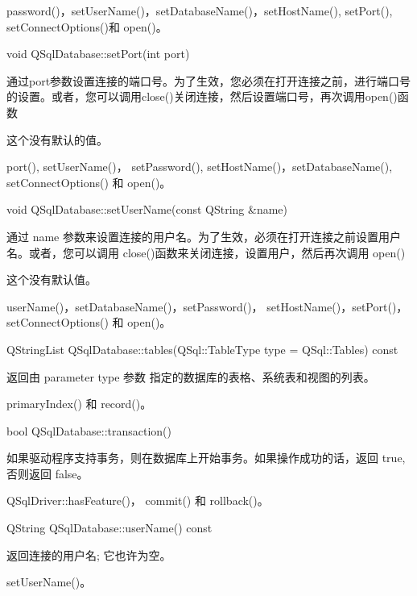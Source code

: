 \begin{seeAlso}
password()，setUserName()，setDatabaseName()，setHostName(),
setPort(), setConnectOptions()和 open()。
\end{seeAlso}

void QSqlDatabase::setPort(int port)

通过port参数设置连接的端口号。为了生效，您必须在打开连接之前，进行端口号的设置。或者，您可以调用close()关闭连接，然后设置端口号，再次调用open()函数

这个没有默认的值。

\begin{seeAlso}
port(), setUserName()， setPassword(),
setHostName()，setDatabaseName(), setConnectOptions() 和 open()。
\end{seeAlso}


void QSqlDatabase::setUserName(const QString \&name)

通过 name 参数来设置连接的用户名。为了生效，必须在打开连接之前设置用户名。或者，您可以调用 close()函数来关闭连接，设置用户，然后再次调用 open()

这个没有默认值。

\begin{seeAlso}
userName()，setDatabaseName()，setPassword()，
setHostName()，setPort()，setConnectOptions() 和 open()。
\end{seeAlso}

QStringList QSqlDatabase::tables(QSql::TableType type = QSql::Tables) const

返回由 parameter type 参数 指定的数据库的表格、系统表和视图的列表。

\begin{seeAlso}
primaryIndex() 和 record()。
\end{seeAlso}

bool QSqlDatabase::transaction()

如果驱动程序支持事务，则在数据库上开始事务。如果操作成功的话，返回 true, 否则返回 false。

\begin{seeAlso}
QSqlDriver::hasFeature()， commit() 和 rollback()。
\end{seeAlso}

QString QSqlDatabase::userName() const

返回连接的用户名; 它也许为空。

\begin{seeAlso}
setUserName()。
\end{seeAlso}

